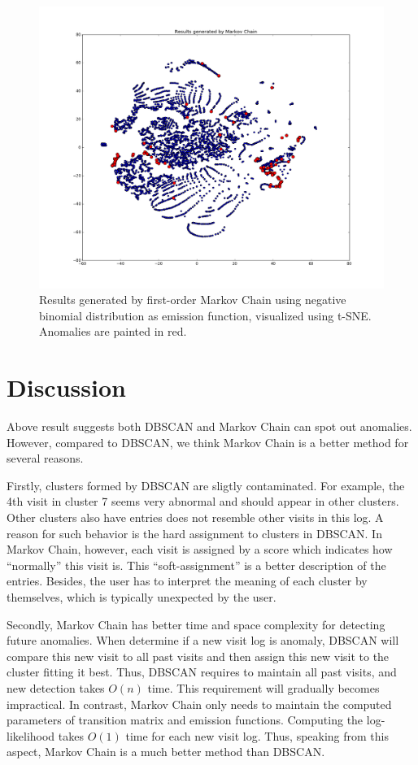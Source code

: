 \begin{figure}
	\begin{center}
		\includegraphics[width=\textwidth]{images/MarkovResult}
		\caption{Results generated by first-order Markov Chain using negative binomial distribution as emission function, visualized using t-SNE. Anomalies are painted in red.}
		\label{fig:MarkovResult}
	\end{center}
\end{figure}

\section{Discussion}
\label{sec:discuss}
Above result suggests both DBSCAN and Markov Chain can spot out anomalies. However, compared to DBSCAN, we think Markov Chain is a better method for several reasons. 

Firstly, clusters formed by DBSCAN are sligtly contaminated. For example, the 4th visit in cluster 7 seems very abnormal and should appear in other clusters. Other clusters also have entries does not resemble other visits in this log. A reason for such behavior is the hard assignment to clusters in DBSCAN. In Markov Chain, however, each visit is assigned by a score which indicates how ``normally'' this visit is. This ``soft-assignment'' is a better description of the entries. Besides, the user has to interpret the meaning of each cluster by themselves, which is typically unexpected by the user.

Secondly, Markov Chain has better time and space complexity for detecting future anomalies. When determine if a new visit log is anomaly, DBSCAN will compare this new visit to all past visits and then assign this new visit to the cluster fitting it best. Thus, DBSCAN requires to maintain all past visits, and new detection takes $O(n)$ time. This requirement will gradually becomes impractical. In contrast, Markov Chain only needs to maintain the computed parameters of transition matrix and emission functions. Computing the log-likelihood takes $O(1)$ time for each new visit log. Thus, speaking from this aspect, Markov Chain is a much better method than DBSCAN.